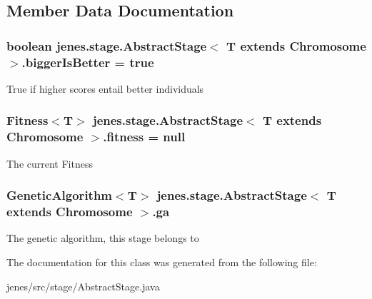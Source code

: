 \subsection{Member Data Documentation}
\hypertarget{classjenes_1_1stage_1_1_abstract_stage_3_01_t_01extends_01_chromosome_01_4_a11da35af3fe950eef9882b03e13690d4}{
\subsubsection[{bigger\-Is\-Better}]{\setlength{\rightskip}{0pt plus 5cm}boolean jenes.\-stage.\-Abstract\-Stage$<$ T extends Chromosome $>$.bigger\-Is\-Better = true\hspace{0.3cm}{\ttfamily [protected]}}}\label{classjenes_1_1stage_1_1_abstract_stage_3_01_t_01extends_01_chromosome_01_4_a11da35af3fe950eef9882b03e13690d4}
True if higher scores entail better individuals \hypertarget{classjenes_1_1stage_1_1_abstract_stage_3_01_t_01extends_01_chromosome_01_4_a697ab8239c1ae2a99445cd7f5fbca45d}{
\subsubsection[{fitness}]{\setlength{\rightskip}{0pt plus 5cm}Fitness$<$T$>$ jenes.\-stage.\-Abstract\-Stage$<$ T extends Chromosome $>$.fitness = null\hspace{0.3cm}{\ttfamily [protected]}}}\label{classjenes_1_1stage_1_1_abstract_stage_3_01_t_01extends_01_chromosome_01_4_a697ab8239c1ae2a99445cd7f5fbca45d}
The current Fitness \hypertarget{classjenes_1_1stage_1_1_abstract_stage_3_01_t_01extends_01_chromosome_01_4_a751aba4f46b29d22592d48422ffa75f9}{
\subsubsection[{ga}]{\setlength{\rightskip}{0pt plus 5cm}Genetic\-Algorithm$<$T$>$ jenes.\-stage.\-Abstract\-Stage$<$ T extends Chromosome $>$.ga\hspace{0.3cm}{\ttfamily [protected]}}}\label{classjenes_1_1stage_1_1_abstract_stage_3_01_t_01extends_01_chromosome_01_4_a751aba4f46b29d22592d48422ffa75f9}
The genetic algorithm, this stage belongs to 

The documentation for this class was generated from the following file\-:\begin{DoxyCompactItemize}
\item 
jenes/src/stage/Abstract\-Stage.\-java\end{DoxyCompactItemize}

